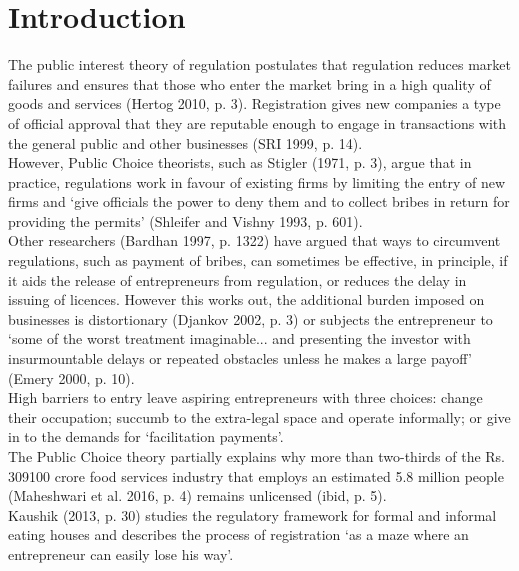 \documentclass[a4paper, 12pt]{article}
\begin{document}
                    \newpage
                    \section{Introduction}
                    \label{intro}
                    The public interest theory of regulation postulates that regulation reduces market failures and ensures that those who enter the market bring in a high quality of goods and services (Hertog 2010, p. 3). Registration gives new companies a type of official approval that they are reputable enough to engage in transactions with the general public and other businesses (SRI 1999, p. 14). \\
                    However, Public Choice theorists, such as Stigler (1971, p. 3), argue that in practice, regulations work in favour of existing firms by limiting the entry of new firms and ‘give officials the power to deny them and to collect bribes in return for providing the permits’ (Shleifer and Vishny 1993, p. 601). \\
                    Other researchers (Bardhan 1997, p. 1322) have argued that ways to circumvent regulations, such as payment of bribes, can sometimes be effective, in principle, if it aids the release of entrepreneurs from regulation, or reduces the delay in issuing of licences. However this works out, the additional burden imposed on businesses is distortionary (Djankov 2002, p. 3) or subjects the entrepreneur to ‘some of the worst treatment imaginable... and presenting the investor with insurmountable delays or repeated obstacles unless he makes a large payoff’ (Emery 2000, p. 10). \\
                    High barriers to entry leave aspiring entrepreneurs with three choices: change their occupation; succumb to the extra-legal space and operate informally; or give in to the demands for ‘facilitation payments’.\\
                    The Public Choice theory partially explains why more than two-thirds of the Rs. 309100 crore food services industry that employs an estimated 5.8 million people (Maheshwari et al. 2016, p. 4) remains unlicensed (ibid, p. 5).\\
                    Kaushik (2013, p. 30) studies the regulatory framework for formal and informal eating houses and describes the process of registration ‘as a maze where an entrepreneur can easily lose his way’. \\
\end{document}
